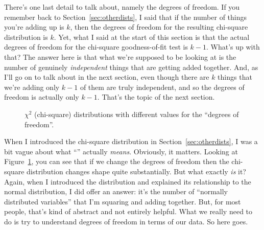 There's one last detail to talk about, namely the degrees of freedom. If you remember back to Section~\ref{sec:otherdists}, I said that if the number of things you're adding up is $k$, then the degrees of freedom for the resulting chi-square distribution is $k$. Yet, what I said at the start of this section is that the actual degrees of freedom for the chi-square goodness-of-fit test is $k-1$. What's up with that? The answer here is that what we're supposed to be looking at is the number of genuinely {\it independent} things that are getting added together. And, as I'll go on to talk about in the next section, even though there are $k$ things that we're adding only $k-1$ of them are truly independent, and so the degrees of freedom is actually only $k-1$. That's the topic of the next section.


\begin{figure}[htb]
\begin{center}
\caption{$\chi^2$ (chi-square) distributions with different values for the ``degrees of freedom''.}
\label{fig:manychi}
\HR
\end{center}
\end{figure}

When I introduced the chi-square distribution in Section~\ref{sec:otherdists}, I was a bit vague about what ``'' actually {\it means}. Obviously, it matters. Looking at Figure~\ref{fig:manychi}, you can see that if we change the degrees of freedom then the chi-square distribution changes shape quite substantially. But what exactly {\it is} it? Again, when I introduced the distribution and explained its relationship to the normal distribution, I did offer an answer: it's the number of ``normally distributed variables'' that I'm squaring and adding together. But, for most people, that's kind of abstract and not entirely helpful. What we really need to do is try to understand degrees of freedom in terms of our data. So here goes.

